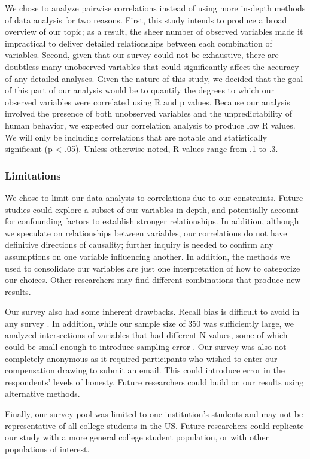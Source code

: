 We chose to analyze pairwise correlations instead of using more in-depth
methods of data analysis for two reasons. First, this study intends to produce
a broad overview of our topic; as a result, the sheer number of observed
variables made it impractical to deliver detailed relationships between each
combination of variables. Second, given that our survey could not be
exhaustive, there are doubtless many unobserved variables that could
significantly affect the accuracy of any detailed analyses. Given the nature
of this study, we decided that the goal of this part of our analysis would be
to quantify the degrees to which our observed variables were correlated using
R and p values. Because our analysis involved the presence of both unobserved variables and
the unpredictability of human behavior, we expected our correlation analysis
to produce low R values. We will only be including correlations that are
notable and statistically significant (p < .05). Unless otherwise noted, R
values range from .1 to .3. 

\subsubsection{Limitations}

We chose to limit our data
analysis to correlations due to our constraints. Future studies could explore
a subset of our variables in-depth, and potentially account for confounding
factors to establish stronger relationships. In addition, although we
speculate on relationships between variables, our correlations do not have
definitive directions of causality; further inquiry is needed to confirm any
assumptions on one variable influencing another. In addition, the methods we
used to consolidate our variables are just one interpretation of how to
categorize our choices. Other researchers may find different combinations that
produce new results.

Our survey also had some inherent drawbacks. Recall bias is difficult to avoid
in any survey \cite{lazar_28}. In addition, while our sample size of 350 was sufficiently
large, we analyzed intersections of variables that had different N values,
some of which could be small enough to introduce sampling error \cite{lazar_28}. Our
survey was also not completely anonymous as it required participants who
wished to enter our compensation drawing to submit an email. This could
introduce error in the respondents' levels of honesty. Future researchers
could build on our results using alternative methods.

Finally, our survey pool was limited to one institution's students and may not be representative of all college students in the US. Future researchers could replicate our study
with a more general college student population, or with other populations of
interest.
